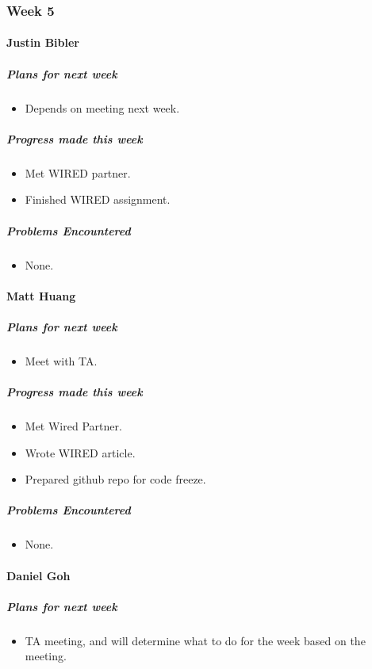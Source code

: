 {
\subsubsection{Week 5}
\paragraph{Justin Bibler}
\subparagraph{Plans for next week}
\begin{itemize}
  \item Depends on meeting next week.
\end{itemize}

\subparagraph{Progress made this week}
\begin{itemize}
  \item Met WIRED partner.
  \item Finished WIRED assignment.
\end{itemize}

\subparagraph{Problems Encountered}
\begin{itemize}
  \item None.
\end{itemize}
\vspace{3mm}

\paragraph{Matt Huang}
\subparagraph{Plans for next week}
\begin{itemize}
  \item Meet with TA.
\end{itemize}

\subparagraph{Progress made this week}
\begin{itemize}
  \item Met Wired Partner.
  \item Wrote WIRED article.
  \item Prepared github repo for code freeze.
\end{itemize}

\subparagraph{Problems Encountered}
\begin{itemize}
  \item None.
\end{itemize}

\vspace{3mm}
\paragraph{Daniel Goh}
\subparagraph{Plans for next week}
\begin{itemize}
  \item TA meeting, and will determine what to do for the week based on the meeting.
\end{itemize}

}
